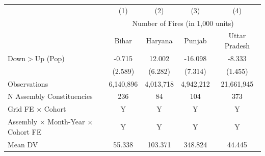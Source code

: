 \begin{tabular}{lcccc} \hline
 & (1) & (2) & (3) & (4) \\
 & \multicolumn{4}{c}{Number of Fires (in 1,000 units)}\\
 & Bihar & Haryana & Punjab & Uttar Pradesh \\ \hline

Down$>$Up (Pop)&      -0.715         &      12.002\sym{*}  &     -16.098\sym{**} &      -8.333\sym{***}\\
            &     (2.589)         &     (6.282)         &     (7.314)         &     (1.455)         \\
\hline
Observations&   6,140,896         &   4,013,718         &   4,942,212         &  21,661,945         \\
N Assembly Constituencies&         236         &          84         &         104         &         373         \\
Grid FE  $\times$ Cohort&           Y         &           Y         &           Y         &           Y         \\
Assembly $\times$ Month-Year $\times$ Cohort FE&           Y         &           Y         &           Y         &           Y         \\
Mean DV     &      55.338         &     103.371         &     348.824         &      44.445         \\
\hline
\end{tabular}
